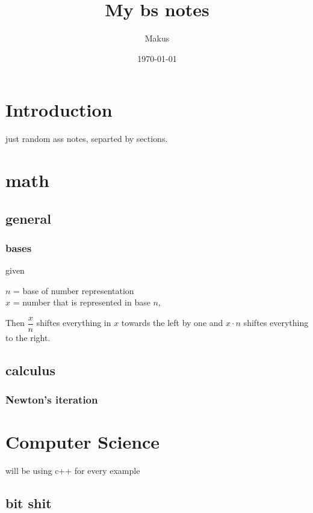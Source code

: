 \documentclass{article} %
\title{My bs notes}
\author{Makus}
\date{\today}
\begin{document}
\maketitle


\tableofcontents

\section{Introduction}
    \begin{center}
        just random ass notes, separted by sections.
    \end{center}
\section{math}
    \subsection{general}
        \subsubsection{bases}
        given  \begin{center}
            $n$ = base of number representation\\
            $x$ = number that is represented in base $n$,
        \end{center}
        Then $\dfrac{x}{n}$ shiftes everything in $x$ towards the left by one and $x\cdot n$ shiftes everything to the right.
    \subsection{calculus}
        \subsubsection{Newton's iteration}
\section{Computer Science}
will be using c++ for every example
    \subsection{bit shit}
\end{document}
